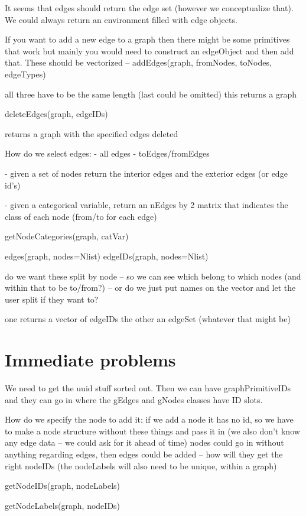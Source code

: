 It seems that edges should return the edge set (however we
conceptualize that). We could always return an environment filled with
edge objects.

If you want to add a new edge to a graph then there might be some
primitives that work but mainly you would need to construct an
edgeObject and then add that.
These should be vectorized -- 
 addEdges(graph, fromNodes, toNodes, edgeTypes)
 
all three have to be the same length (last could be omitted)
this returns a graph

 deleteEdges(graph, edgeIDs)
 
 returns a graph with the specified edges deleted

How do we select edges:
 - all edges
 - toEdges/fromEdges

 - given a set of nodes return the interior edges and the
   exterior edges (or edge id's)

 - given a categorical variable, return an nEdges by 2 matrix
   that indicates the class of each node (from/to for each edge)

  getNodeCategories(graph, catVar)


 edges(graph, nodes=Nlist)
 edgeIDs(graph, nodes=Nlist)

 do we want these split by node -- so we can see which belong
   to which nodes (and within that to be to/from?) -- or do we just 
  put names on the vector and let the user split if they want to?

 one returns a vector of edgeIDs the other an edgeSet (whatever that
  might be)

 
\section*{Immediate problems}

 We need to get the uuid stuff sorted out. Then we can have 
 graphPrimitiveIDs and they can go in where
 the gEdges and gNodes classes have ID slots.

 How do we specify the node to add it:
  if we add a node it has no id, so we have to make a node
  structure without these things and pass it in
  (we also don't know any edge data -- we could ask for it
   ahead of time)
  nodes could go in without anything regarding edges,
  then edges could be added -- how will they get the right nodeIDs
  (the nodeLabels will also need to be unique, within a graph)

  getNodeIDs(graph, nodeLabels)

  getNodeLabels(graph, nodeIDs)

  





